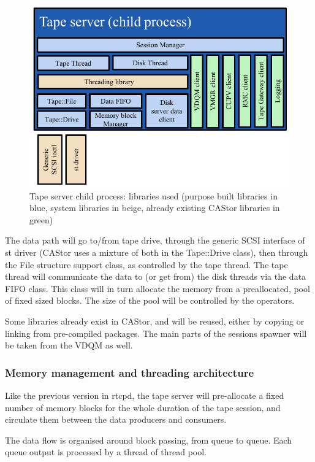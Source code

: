 \begin{figure}[h]
\begin{center}
\includegraphics{images/TapeServerChildProcess}
\end{center}
\caption{\label{tsChildProcess}Tape server child process: libraries used (purpose built libraries in blue, system libraries in beige, already existing CAStor libraries in green)}
\end{figure}

The data path will go to/from tape drive, through the generic SCSI interface of st driver (CAStor uses a
mixture of both in the Tape::Drive class), then through the File structure support class, as controlled by
the tape thread. The tape thread will communicate the data to (or get from) the disk threads via the 
data FIFO class. This class will in turn allocate the memory from a preallocated, pool of
fixed sized blocks. The size of the pool will be controlled by the operators.

Some libraries already exist in CAStor, and will be reused, either by copying or linking from pre-compiled 
packages. The main parts of the sessions spawner will be taken from the VDQM as well.

\subsubsection{Memory management and threading architecture}
Like the previous version in rtcpd, the tape server will pre-allocate a fixed number of memory
blocks for the whole duration of the tape session, and circulate them between the data producers 
and consumers.

The data flow is organised around block passing, from queue to queue. Each queue output is processed
by a thread of thread pool.

